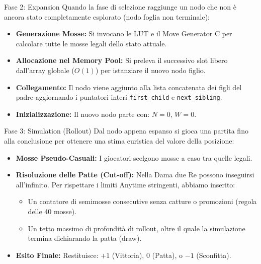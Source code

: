 \documentclass[10pt]{beamer}
\begin{document}
\begin{frame}{Fase 2: Expansion}
    Quando la fase di selezione raggiunge un nodo che non è ancora stato completamente esplorato (nodo foglia non terminale):
    
    \vspace{0.3cm}
    \begin{itemize}
        \item \textbf{Generazione Mosse:} Si invocano le LUT e il Move Generator C per calcolare tutte le mosse legali dello stato attuale.
        \item \textbf{Allocazione nel Memory Pool:} Si preleva il successivo slot libero dall'array globale ($O(1)$) per istanziare il nuovo nodo figlio.
        \item \textbf{Collegamento:} Il nodo viene aggiunto alla lista concatenata dei figli del padre aggiornando i puntatori interi \texttt{first\_child} e \texttt{next\_sibling}.
        \item \textbf{Inizializzazione:} Il nuovo nodo parte con: $N = 0$, $W = 0$.
    \end{itemize}
\end{frame}

\begin{frame}{Fase 3: Simulation (Rollout)}
    Dal nodo appena espanso si gioca una partita fino alla conclusione per ottenere una stima euristica del valore della posizione:
    
    \vspace{0.3cm}
    \begin{itemize}
        \item \textbf{Mosse Pseudo-Casuali:} I giocatori scelgono mosse a caso tra quelle legali.
        \item \textbf{Risoluzione delle Patte (Cut-off):} Nella Dama due Re possono inseguirsi all'infinito. Per rispettare i limiti Anytime stringenti, abbiamo inserito:
        \begin{itemize}
            \item Un contatore di semimosse consecutive senza catture o promozioni (regola delle 40 mosse).
            \item Un tetto massimo di profondità di rollout, oltre il quale la simulazione termina dichiarando la patta (draw).
        \end{itemize}
        \item \textbf{Esito Finale:} Restituisce: $+1$ (Vittoria), $0$ (Patta), o $-1$ (Sconfitta).
    \end{itemize}
\end{frame}
\end{document}
